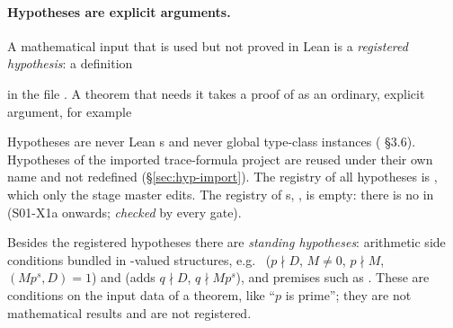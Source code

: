 \paragraph{Hypotheses are explicit arguments.}
A mathematical input that is used but not proved in Lean is a \emph{registered hypothesis}: a definition
\begin{center}\end{center}
in the file . A theorem that needs it takes a proof of  as an
ordinary, explicit argument, for example
\begin{center}
\end{center}
Hypotheses are never Lean s and never global type-class instances (
\S3.6). Hypotheses of the imported trace-formula project are reused under their own name and not redefined
(\S\ref{sec:hyp-import}). The registry of all hypotheses is , which only the
stage master edits. The registry of s, , is empty: there is no
 in  (S01-X1a onwards; \emph{checked} by every gate).

Besides the registered hypotheses there are \emph{standing hypotheses}: arithmetic side conditions bundled in
-valued structures, e.g.\  ($p\nmid D$, $M\neq 0$, $p\nmid M$,
$(Mp^s,D)=1$) and  (adds $q\nmid D$, $q\nmid Mp^s$), and premises such as
. These are conditions on the input data of a theorem, like ``$p$ is prime'';
they are not mathematical results and are not registered.

